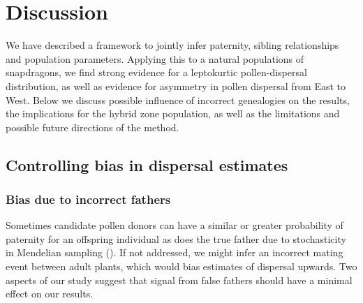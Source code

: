 \documentclass[10pt, a4paper, twocolumn]{article} %
\begin{document}
\subsection{}

\section{Discussion}

We have described a framework to jointly infer paternity, sibling relationships and population parameters. 
Applying this to a natural populations of snapdragons, we find strong evidence for a leptokurtic pollen-dispersal distribution, as well as evidence for asymmetry in pollen dispersal from East to West.
Below we discuss possible influence of incorrect genealogies on the results, the implications for the hybrid zone population, as well as the limitations and possible future directions of the method.

\subsection{Controlling bias in dispersal estimates}

\subsubsection{Bias due to incorrect fathers}

Sometimes candidate pollen donors can have a similar or greater probability of paternity for an offspring individual as does the true father due to stochasticity in Mendelian sampling (\cite{thompson1976paradox}).
If not addressed, we might infer an incorrect mating event between adult plants, which would bias estimates of dispersal upwards.
Two aspects of our study suggest that signal from false fathers should have a minimal effect on our results.
\end{document}
